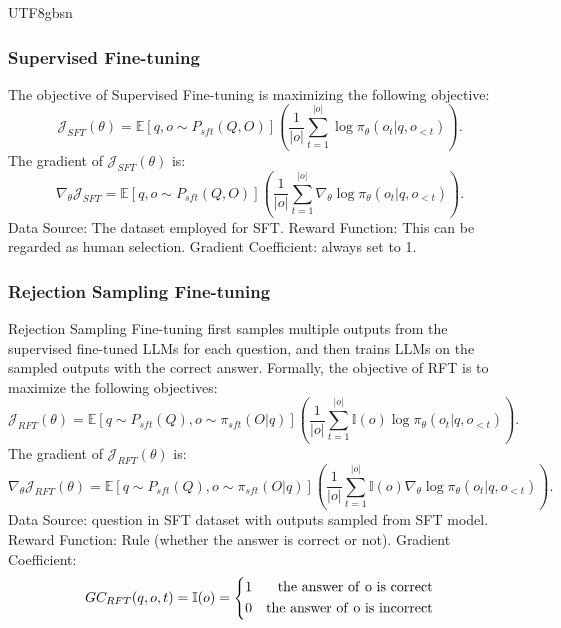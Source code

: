\documentclass[11pt, a4paper, logo, copyright, nonumbering]{deepseek}
\begin{document}
\begin{CJK*}{UTF8}{gbsn}
\subsubsection{Supervised Fine-tuning}
The objective of Supervised Fine-tuning is maximizing the following objective:
\begin{equation}
\mathcal{J}_{SFT}(\theta)=\mathbb{E}[q, o \sim P_{sft}(Q, O)]\left(\frac{1}{|o|}\sum_{t=1}^{|o|} \log \pi_\theta(o_t | q, o_{<t})\right).
\label{eq:mle}
\end{equation}
The gradient of $\mathcal{J}_{SFT}(\theta)$ is:
\begin{equation}
\nabla_{\theta}\mathcal{J}_{SFT} = \mathbb{E}[q, o \sim P_{sft}(Q, O)]\left(\frac{1}{|o|}\sum_{t=1}^{|o|} \nabla_{\theta} \log \pi_\theta(o_{t} | q, o_{<t})\right).
\end{equation}
Data Source: The dataset employed for SFT. Reward Function: This can be regarded as human selection. Gradient Coefficient: always set to 1.


\subsubsection{Rejection Sampling Fine-tuning} 
Rejection Sampling Fine-tuning first samples multiple outputs from the supervised fine-tuned LLMs for each question, and then trains LLMs on the sampled outputs with the correct answer.
Formally, the objective of RFT is to maximize the following objectives:
\begin{equation}
\mathcal{J}_{RFT}(\theta)= \mathbb{E}[q \sim P_{sft}(Q), o \sim \pi_{sft}(O|q)]\left( \frac{1}{|o|}\sum_{t=1}^{|o|} \mathbb{I}(o) \log \pi_\theta(o_{t} | q, o_{<t})\right).
\end{equation}
The gradient of $\mathcal{J}_{RFT}(\theta)$ is:
\begin{equation}
\nabla_{\theta}\mathcal{J}_{RFT}(\theta)= \mathbb{E}[{q \sim P_{sft}(Q), o \sim \pi_{sft}(O|q)}]\left( \frac{1}{|o|}\sum_{t=1}^{|o|} {\mathbb{I}(o)} \nabla_{\theta}\log \pi_\theta(o_{t} | q, o_{<t})\right).
\end{equation}
Data Source: question in SFT dataset with outputs sampled from SFT model. Reward Function: Rule (whether the answer is correct or not). Gradient Coefficient:
\begin{equation}
GC_{RFT}(q, o, t) = \mathbb{I}(o)=\left\{
\begin{aligned}
1  & & {\rm the \ answer \ of \ o \ is \ correct} \\
0  & & {\rm the \ answer \ of \ o \ is \ incorrect} \\
\end{aligned}
\right.
\label{eq:GC-RFT}
\end{equation}

\end{CJK*}
\end{document}
